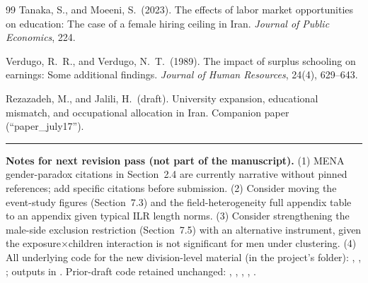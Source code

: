 \documentclass[11pt]{article}
\begin{document}
\begin{thebibliography}{99}
Tanaka, S., and Moeeni, S.\ (2023). The effects of labor market opportunities on education: The case of a female hiring ceiling in Iran. \emph{Journal of Public Economics}, 224.

Verdugo, R.\ R., and Verdugo, N.\ T.\ (1989). The impact of surplus schooling on earnings: Some additional findings. \emph{Journal of Human Resources}, 24(4), 629--643.

Rezazadeh, M., and Jalili, H.\ (draft). University expansion, educational mismatch, and occupational allocation in Iran. Companion paper (``paper\_july17'').

\end{thebibliography}

\vspace{12pt}
\noindent\rule{\textwidth}{0.4pt}
\vspace{4pt}

\begin{small}
\raggedright
\noindent\textbf{Notes for next revision pass (not part of the manuscript).} (1) MENA gender-paradox citations in Section~2.4 are currently narrative without pinned references; add specific citations before submission. (2) Consider moving the event-study figures (Section~7.3) and the field-heterogeneity full appendix table to an appendix given typical ILR length norms. (3) Consider strengthening the male-side exclusion restriction (Section~7.5) with an alternative instrument, given the exposure$\times$children interaction is not significant for men under clustering. (4) All underlying code for the new division-level material (in the project's  folder): , , ; outputs in . Prior-draft code retained unchanged: , , , , .
\end{small}
\end{document}
